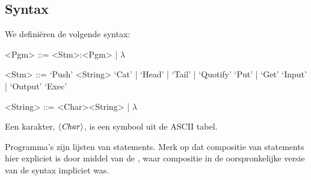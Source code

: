 \subsection{Syntax}
\label{sec:def:syn}
We definiëren de volgende syntax:
\setlength{\grammarindent}{5em}
\begin{grammar}
	<Pgm> ::= <Stm>:<Pgm> | $\lambda$

	<Stm> ::= `Push' <String>
		\alt `Cat' | `Head' | `Tail' | `Quotify'
		\alt `Put' | `Get'
		\alt `Input' | `Output'
		\alt `Exec'

	<String> ::= <Char><String> | $\lambda$
\end{grammar}

Een karakter, $\langle\mathit{Char}\rangle$, is een symbool uit de ASCII tabel.

Programma's zijn lijsten van statements. Merk op dat compositie van statements
hier expliciet is door middel van de \lit{:}, waar compositie in de
oorspronkelijke versie van de syntax impliciet was.
